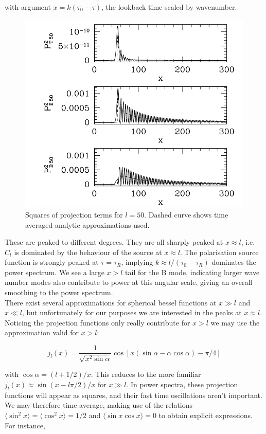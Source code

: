 \documentclass[a4paper,10pt]{article}
\begin{document}
with argument $x=k(\tau_0-\tau)$, the lookback time scaled by wavenumber. 

\begin{figure}[h]
  \includegraphics[width=0.7\linewidth]{projection.png}
  \centering
  \caption{Squares of projection terms for $l=50$. Dashed curve shows time averaged analytic approximations used.}
\end{figure}


These are peaked to different degrees. They are all sharply peaked at $x\approx l$, i.e. $C_l$ is dominated by the behaviour of the source at $x\approx l$. The polarisation source function is strongly peaked at $\tau=\tau_R$, implying $k\approx l/(\tau_0-\tau_R)$ dominates the power spectrum. We see a large $x>l$ tail for the B mode, indicating larger wave number modes also contribute to power at this angular scale, giving an overall smoothing to the power spectrum.\\

There exist several approximations for spherical bessel functions at $x\gg l$ and $x\ll l$, but unfortunately for our purposes we are interested in the peaks at $x\approx l$. Noticing the projection functions only really contribute for $x>l$ we may use the approximation valid for $x>l$:

\begin{equation}
j_l(x) = \frac{1}{\sqrt{x^2\sin\alpha}}\cos[x(\sin\alpha-\alpha\cos\alpha)-\pi/4]
\end{equation}

with $\cos\alpha=(l+1/2)/x$. This reduces to the more familiar $j_l(x) \approx \sin(x-l\pi/2)/x$ for $x\gg l$. In power spectra, these projection functions will appear as squares, and their fast time oscillations aren't important. We may therefore time average, making use of the relations $\langle \sin^2x \rangle = \langle \cos^2x \rangle = 1/2$ and $\langle \sin x\cos x \rangle = 0$ to obtain explicit expressions. For instance,
\end{document}
